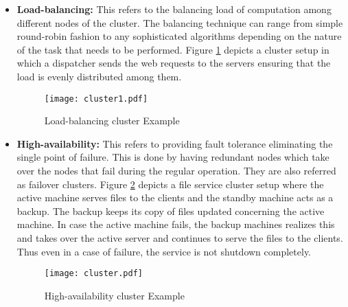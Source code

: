 \begin{itemize}
  \item \textbf{Load-balancing:} This refers to the balancing load of computation among different nodes of the cluster. The balancing technique can range from simple round-robin fashion to any sophisticated algorithms depending on the nature of the task that needs to be performed. Figure \ref{figures:cluster1} depicts a cluster setup in which a dispatcher sends the web requests to the servers ensuring that the load is evenly distributed among them.
  
    \makeatletter
    \setlength{\intextsep}{25pt}
    \makeatother

    \begin{figure}[h!]
    \centering
    \texttt{[image: cluster1.pdf]}
    \caption{Load-balancing cluster Example}\label{figures:cluster1}
    \end{figure}

  \item \textbf{High-availability:} This refers to providing fault tolerance eliminating the single point of failure. This is done by having redundant nodes which take over the nodes that fail during the regular operation. They are also referred as failover clusters. Figure \ref{figures:cluster} depicts a file service cluster setup where the active machine serves files to the clients and the standby machine acts as a backup. The backup keeps its copy of files updated concerning the active machine. In case the active machine fails, the backup machines realizes this and takes over the active server and continues to serve the files to the clients. Thus even in a case of failure, the service is not shutdown completely.

    \makeatletter
    \setlength{\intextsep}{25pt}
    \makeatother

    \begin{figure}[h!]
    \centering
    \texttt{[image: cluster.pdf]}
    \caption{High-availability cluster Example}\label{figures:cluster}
    \end{figure}

\end{itemize} 

